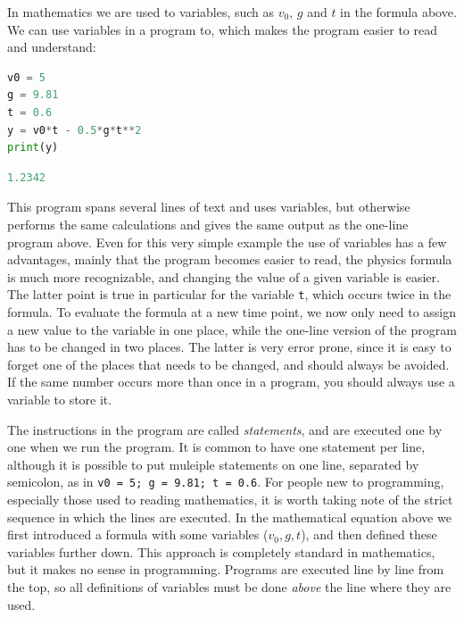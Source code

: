 \documentclass[graybox,envcountchap,sectrefs,final]{svmonodo}
\begin{document}
In mathematics we are used to variables, such as $v_0$, $g$ and $t$ in the formula above. We can use variables in a
program to, which makes the program easier to read and understand:
\begin{lstlisting}[language=Python,style=blue1]
v0 = 5
g = 9.81
t = 0.6
y = v0*t - 0.5*g*t**2
print(y)
\end{lstlisting}
\begin{lstlisting}[language=Python,style=gray]
1.2342
\end{lstlisting}
This program spans several lines of text and uses variables, but otherwise performs the same calculations
and gives the same output as the one-line program above. Even for this very simple example the use of
variables has a few advantages, mainly that the program becomes easier to read, the physics formula
is much more recognizable, and changing the value of a given variable is easier. The latter point is true in
particular for the variable \texttt{t}, which occurs twice in the formula. To evaluate the formula at a new time point,
we now only need to assign a new value to the variable in one place, while the one-line version of the program has to be
changed in two places. The latter is very error prone, since it is easy to forget one of the places that needs to be changed,
and should always be avoided. If the same number occurs more than once in a program, you should always use a
variable to store it.

The instructions in the program are called \emph{statements}, and are executed one by one when we run the program.
It is common to have one statement per line, although it is possible to put muleiple statements on one line,
separated by semicolon, as in \texttt{v0 = 5; g = 9.81; t = 0.6}.
For people new to programming, especially those
used to reading mathematics, it is worth taking note of
the strict sequence in which the lines are executed. In the mathematical equation above we first introduced a formula with
some variables ($v_0, g, t$), and then defined these variables further down. This approach is completely standard
in mathematics, but it makes no sense in programming. Programs are executed line by line from the top, so all definitions of
variables must be done \emph{above} the line where they are used.
\end{document}
